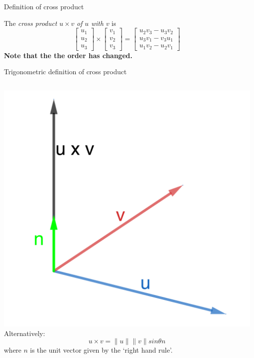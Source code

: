 \documentclass{beamer}
\begin{document}
\begin{frame}{Definition of cross product}
\begin{definition}
The \emph{cross product $u\times v$ of $u$ with $v$} is
\begin{equation*}
\left[
\begin{array}{c}
u_1\\
u_2\\
u_3
\end{array}
\right]\times \left[
\begin{array}{c}
v_1\\
v_2\\
v_3
\end{array}
\right] = \left[
\begin{array}{c}
u_2v_3-u_3v_2\\
u_3v_1-v_3u_1\\
u_1v_2-u_2v_1
\end{array}
\right]
\end{equation*}
\textbf{Note that the the order has changed.}
\end{definition}
\end{frame}

\begin{frame}{Trigonometric definition of cross product}
\begin{columns}
  \includegraphics{cross-product-direction.png}
  Alternatively:
  \begin{equation*}
  u\times v = \|u\|\|v\| sin\theta n
  \end{equation*}
  where $n$ is the unit vector given by the `right hand rule'.
\end{columns}
\end{frame}
\end{document}
